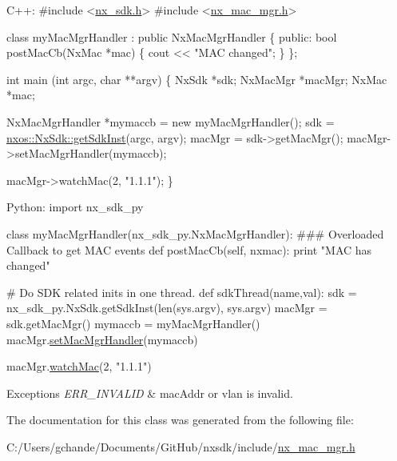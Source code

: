 \begin{DoxyCode}
C++:
\textcolor{preprocessor}{     #include <\mbox{\hyperlink{nx__sdk_8h}{nx\_sdk.h}}>}
\textcolor{preprocessor}{     #include <\mbox{\hyperlink{nx__mac__mgr_8h}{nx\_mac\_mgr.h}}>}

     \textcolor{keyword}{class }myMacMgrHandler : \textcolor{keyword}{public} NxMacMgrHandler \{
        \textcolor{keyword}{public}:
           \textcolor{keywordtype}{bool} postMacCb(NxMac *mac) \{
                cout << \textcolor{stringliteral}{"MAC changed"};
           \}
     \};

     \textcolor{keywordtype}{int}  main (\textcolor{keywordtype}{int} argc, \textcolor{keywordtype}{char} **argv)
     \{
          NxSdk    *sdk;
          NxMacMgr *macMgr;
          NxMac    *mac;

          NxMacMgrHandler *mymaccb = \textcolor{keyword}{new} myMacMgrHandler();
          sdk = \mbox{\hyperlink{classnxos_1_1_nx_sdk_a5050e2d26c40744b4fc7862068a83f39}{nxos::NxSdk::getSdkInst}}(argc, argv);
          macMgr = sdk->getMacMgr();
          macMgr->setMacMgrHandler(mymaccb);

          macMgr->watchMac(2, \textcolor{stringliteral}{"1.1.1"});
     \}

Python:
   \textcolor{keyword}{import} nx\_sdk\_py

   \textcolor{keyword}{class }myMacMgrHandler(nx\_sdk\_py.NxMacMgrHandler):
\textcolor{preprocessor}{   ### Overloaded Callback to get MAC events}
         def postMacCb(self, nxmac):
             print "MAC has changed"

\textcolor{preprocessor}{   # Do SDK related inits in one thread.}
   def sdkThread(name,val):
       sdk = nx\_sdk\_py.NxSdk.getSdkInst(len(sys.argv), sys.argv)
       macMgr = sdk.getMacMgr()
       mymaccb = myMacMgrHandler()
       macMgr.\mbox{\hyperlink{classnxos_1_1_nx_mac_mgr_a06f53bd41ddb17e6cfaef5a02b00415d}{setMacMgrHandler}}(mymaccb)

       macMgr.\mbox{\hyperlink{classnxos_1_1_nx_mac_mgr_a12dde38c22d9a27e1e3bde318d418134}{watchMac}}(2, "1.1.1")
\end{DoxyCode}



\begin{DoxyExceptions}{Exceptions}
{\em E\+R\+R\+\_\+\+I\+N\+V\+A\+L\+ID} & mac\+Addr or vlan is invalid. \\
\hline
\end{DoxyExceptions}


The documentation for this class was generated from the following file\+:\begin{DoxyCompactItemize}
\item 
C\+:/\+Users/gchande/\+Documents/\+Git\+Hub/nxsdk/include/\mbox{\hyperlink{nx__mac__mgr_8h}{nx\+\_\+mac\+\_\+mgr.\+h}}\end{DoxyCompactItemize}
